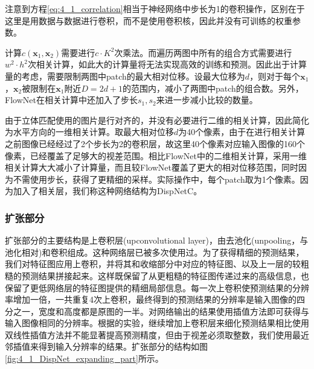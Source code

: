 注意到方程\ref{eq:4_1_correlation}相当于神经网络中步长为1的卷积操作，区别在于这里是用数据与数据进行卷积，而不是使用卷积核，因此并没有可训练的权重参数。

计算$c(\mathbf{x}_1, \mathbf{x}_2)$需要进行$c\cdot K^2$次乘法。而遍历两图中所有的组合方式需要进行$w^2  \cdot h^2$次相关计算，如此大的计算量将无法实现高效的训练和预测。因此出于计算量的考虑，需要限制两图中patch的最大相对位移。设最大位移为$d$，则对于每个$\mathbf{x}_1$，$\mathbf{x}_2$被限制在$\mathbf{x}_1$附近$D=2d+1$的范围内，减小了两图中patch的组合数。另外，FlowNet在相关计算中还加入了步长$s_1, s_2$来进一步减小比较的数量。

由于立体匹配使用的图片是行对齐的，并没有必要进行二维的相关计算，因此简化为水平方向的一维相关计算。取最大相对位移$d$为40个像素，由于在进行相关计算之前图像已经经过了2个步长为2的卷积层，故这里40个像素对应输入图像的160个像素，已经覆盖了足够大的视差范围。相比FlowNet中的二维相关计算，采用一维相关计算大大减小了计算量，而且较FlowNet覆盖了更大的相对位移范围，同时因为不需使用步长，获得了更精细的采样。实际操作中，每个patch取为1个像素。因为加入了相关层，我们称这种网络结构为DispNetC。

\subsubsection{扩张部分}
扩张部分的主要结构是上卷积层(upconvolutional layer)，由去池化(unpooling，与池化相对)和卷积组成。这种网络层已被多次使用过\cite{zeiler2011adaptive, zeiler2014visualizing, goodfellow2014generative}。为了获得精细的预测结果，我们对特征图应用上卷积，并将其和收缩部分中对应的特征图、以及上一层的较粗糙的预测结果拼接起来。这样既保留了从更粗糙的特征图传递过来的高级信息，也保留了更低网络层的特征图提供的精细局部信息。每一次上卷积使预测结果的分辨率增加一倍，一共重复4次上卷积，最终得到的预测结果的分辨率是输入图像的四分之一，宽度和高度都是原图的一半。对网络输出的结果使用插值方法即可获得与输入图像相同的分辨率。根据\cite{dosovitskiy2015flownet}的实验，继续增加上卷积层来细化预测结果相比使用双线性插值方法并不能显著提高预测精度，但由于视差必须取整数，我们使用最近邻插值来得到输入分辨率的结果。扩张部分的结构如图\ref{fig:4_1_DispNet_expanding_part}所示。

